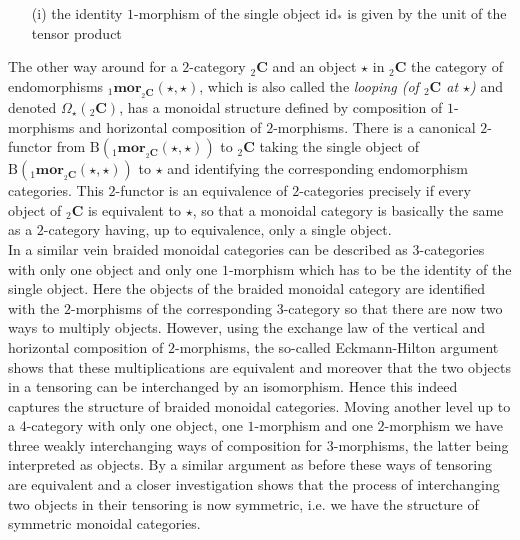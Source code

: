 \begin{itemize}
\begin{enumerate}
\item[(i)]
the identity $1$-morphism of the single object $\mathrm{id}_{\ast}$ is given by the unit of the tensor product
\end{enumerate}
The other way around for a $2$-category ${_{2}}\mathbf{C}$ and an object $\star$ in ${_{2}}\mathbf{C}$ the category of endomorphisms ${_{1}}\mathbf{mor}_{{_{2}}\mathbf{C}}(\star,\star)$, which is also called the \textit{looping (of ${_{2}}\mathbf{C}$ at $\star$)} and denoted $\Omega_{\star}({_{2}}\mathbf{C})$, has a monoidal structure defined by composition of $1$-morphisms and horizontal composition of $2$-morphisms. There is a canonical $2$-functor from $\mathrm{B}({_{1}}\mathbf{mor}_{{_{2}}\mathbf{C}}(\star,\star))$ to ${_{2}}\mathbf{C}$ taking the single object of $\mathrm{B}({_{1}}\mathbf{mor}_{{_{2}}\mathbf{C}}(\star,\star))$ to $\star$ and identifying the corresponding endomorphism categories. This $2$-functor is an equivalence of $2$-categories precisely if every object of ${_{2}}\mathbf{C}$ is equivalent to $\star$, so that a monoidal category is basically the same as a $2$-category having, up to equivalence, only a single object.
\\
In a similar vein braided monoidal categories can be described as $3$-categories with only one object and only one $1$-morphism which has to be the identity of the single object. Here the objects of the braided monoidal category are identified with the $2$-morphisms of the corresponding $3$-category so that there are now two ways to multiply objects. However, using the exchange law of the vertical and horizontal composition of $2$-morphisms, the so-called Eckmann-Hilton argument shows that these multiplications are equivalent and moreover that the two objects in a tensoring can be interchanged by an isomorphism. Hence this indeed captures the structure of braided monoidal categories. Moving another level up to a $4$-category with only one object, one $1$-morphism and one $2$-morphism we have three weakly interchanging ways of composition for $3$-morphisms, the latter being interpreted as objects. By a similar argument as before these ways of tensoring are equivalent and a closer investigation shows that the process of interchanging two objects in their tensoring is now symmetric, i.e. we have the structure of symmetric monoidal categories.
\\

\end{itemize}
